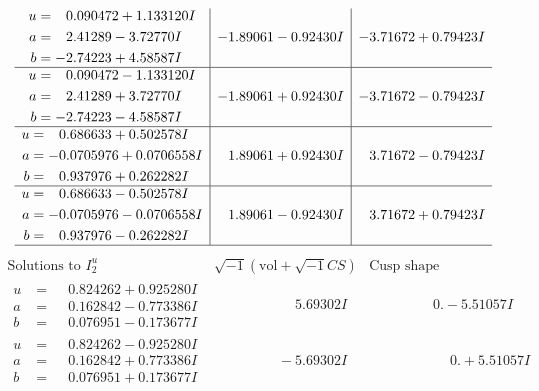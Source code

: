 \documentclass[1p]{elsarticle_modified}
\theoremstyle{definition}
\newcommand{\I}{\sqrt{-1}}
\begin{document}
$$\begin{array}{c|c|c}
\begin{aligned}
u &= \phantom{-}0.090472 + 1.133120 I \\
a &= \phantom{-}2.41289 - 3.72770 I \\
b &= -2.74223 + 4.58587 I\end{aligned}
 & -1.89061 - 0.92430 I & -3.71672 + 0.79423 I \\ \hline\begin{aligned}
u &= \phantom{-}0.090472 - 1.133120 I \\
a &= \phantom{-}2.41289 + 3.72770 I \\
b &= -2.74223 - 4.58587 I\end{aligned}
 & -1.89061 + 0.92430 I & -3.71672 - 0.79423 I \\ \hline\begin{aligned}
u &= \phantom{-}0.686633 + 0.502578 I \\
a &= -0.0705976 + 0.0706558 I \\
b &= \phantom{-}0.937976 + 0.262282 I\end{aligned}
 & \phantom{-}1.89061 + 0.92430 I & \phantom{-}3.71672 - 0.79423 I \\ \hline\begin{aligned}
u &= \phantom{-}0.686633 - 0.502578 I \\
a &= -0.0705976 - 0.0706558 I \\
b &= \phantom{-}0.937976 - 0.262282 I\end{aligned}
 & \phantom{-}1.89061 - 0.92430 I & \phantom{-}3.71672 + 0.79423 I\\
 \hline 
 \end{array}$$\newpage$$\begin{array}{c|c|c}  
\text{Solutions to }I^u_{2}& \I (\text{vol} + \sqrt{-1}CS) & \text{Cusp shape}\\
 \hline 
\begin{aligned}
u &= \phantom{-}0.824262 + 0.925280 I \\
a &= \phantom{-}0.162842 - 0.773386 I \\
b &= \phantom{-}0.076951 - 0.173677 I\end{aligned}
 & \phantom{-0.000000 -}5.69302 I & \phantom{-0.000000 } 0. - 5.51057 I \\ \hline\begin{aligned}
u &= \phantom{-}0.824262 - 0.925280 I \\
a &= \phantom{-}0.162842 + 0.773386 I \\
b &= \phantom{-}0.076951 + 0.173677 I\end{aligned}
 & \phantom{-0.000000 } -5.69302 I & \phantom{-0.000000 -}0. + 5.51057 I \\ \hline\begin{aligned}

\end{aligned}
\end{array}$$
\end{document}
